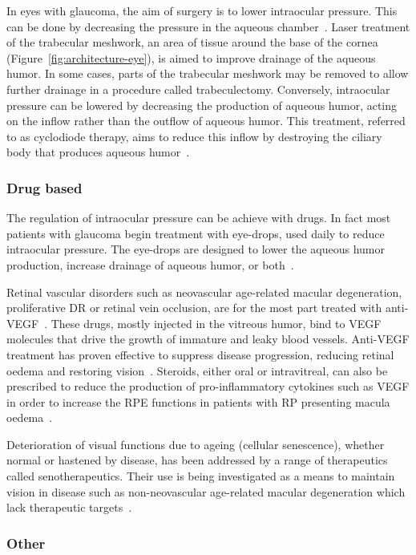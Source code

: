 \documentclass{article}
\begin{document}
In eyes with glaucoma, the aim of surgery is to lower intraocular pressure.
This can be done by decreasing the pressure in the aqueous chamber~\cite{Quigley_2011}.
Laser treatment of the trabecular meshwork, an area of tissue around the base of the cornea (Figure~\ref{fig:architecture-eye}), is aimed to improve drainage of the aqueous humor.
In some cases, parts of the trabecular meshwork may be removed to allow further drainage in a procedure called trabeculectomy.
Conversely, intraocular pressure can be lowered by decreasing the production of aqueous humor, acting on the inflow rather than the outflow of aqueous humor.
This treatment, referred to as cyclodiode therapy, aims to reduce this inflow by destroying the ciliary body that produces aqueous humor~\cite{Allbon_2022}.

\subsubsection{Drug based}

The regulation of intraocular pressure can be achieve with drugs.
In fact most patients with glaucoma begin treatment with eye-drops, used daily to reduce intraocular pressure.
The eye-drops are designed to lower the aqueous humor production, increase drainage of aqueous humor, or both~\cite{Chakrabarti_2022,Quigley_2011}.

Retinal vascular disorders such as neovascular age-related macular degeneration, proliferative DR or retinal vein occlusion, are for the most part treated with anti-VEGF~\cite{Andreoli_2007,Kim_2021}.
These drugs, mostly injected in the vitreous humor, bind to VEGF molecules that drive the growth of immature and leaky blood vessels.
Anti-VEGF treatment has proven effective to suppress disease progression, reducing retinal oedema and restoring vision~\cite{Andreoli_2007,Heier_2006,Kim_2021}.
Steroids, either oral or intravitreal, can also be prescribed to reduce the production of pro-inflammatory cytokines such as VEGF in order to increase the RPE functions in patients with RP presenting macula oedema~\cite{Strong_2016}.

Deterioration of visual functions due to ageing (cellular senescence), whether normal or hastened by disease, has been addressed by a range of therapeutics called senotherapeutics.
Their use is being investigated as a means to maintain vision in disease such as non-neovascular age-related macular degeneration which lack therapeutic targets~\cite{Lee_2021}.


\subsubsection{Other}
\end{document}
